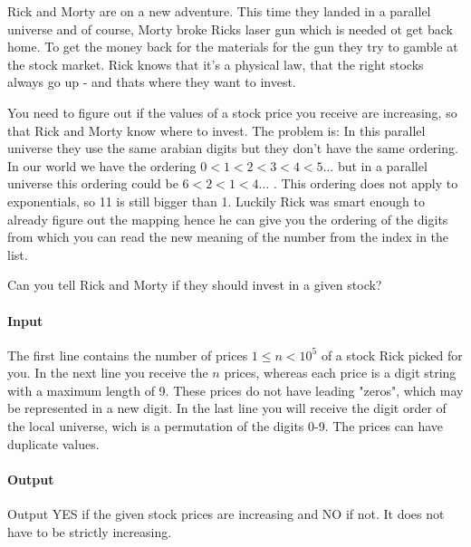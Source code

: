 



\makeheader

Rick and Morty are on a new adventure. This time they landed in a parallel universe and of course, Morty broke Ricks laser gun which is needed ot get back home. To get the money back for the materials for the gun they try to gamble at the stock market. Rick knows that it's a physical law, that the right stocks always go up - and thats where they want to invest. 

You need to figure out if the values of a stock price you receive are increasing, so that Rick and Morty know where to invest. The problem is: In this parallel universe they use the same arabian digits but they don't have the same ordering. In our world we have the ordering $0 < 1 < 2 < 3 < 4 < 5 ...$ but in a parallel universe this ordering could be $6 < 2 < 1 < 4 \dots$ . This ordering does not apply to exponentials, so 11 is still bigger than 1. Luckily Rick was smart enough to already figure out the mapping hence he can give you the ordering of the digits from which you can read the new meaning of the number from the index in the list.

Can you tell Rick and Morty if they should invest in a given stock?

\paragraph*{Input}

The first line contains the number of prices $1\leq n<10^5$ of a stock Rick picked for you. In the next line you receive the $n$ prices, whereas each price is a digit string with a maximum length of 9. These prices do not have leading "zeros", which may be represented in a new digit. In the last line you will receive the digit order of the local universe, wich is a permutation of the digits 0-9. The prices can have duplicate values.

\paragraph*{Output}

Output YES if the given stock prices are increasing and NO if not. It does not have to be strictly increasing.

\begin{samples}
\end{samples}



